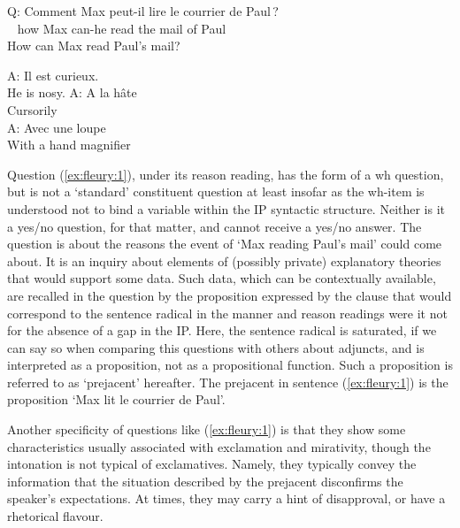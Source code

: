 \documentclass[output=paper,colorlinks,citecolor=brown,
]{langscibook}
\begin{document}
\begin{exe}
\ex\label{ex:fleury:1} 
\gll Q:  Comment Max peut-il lire le courrier de Paul\,?  \\   
{~} how Max can-he read the mail of Paul \\ 
\glt {~~~~} How can Max read Paul's mail? 
\begin{xlist}
\ex \label{ex:fleury:1a} 
A: Il est curieux.\\
He is nosy.
\ex \label{ex:fleury:1b}
A: A la h\^ate\\
\glt Cursorily\\
\ex \label{ex:fleury:1c}
A: Avec une loupe\\
With a hand magnifier\\
\end{xlist}
\end{exe}

Question (\ref{ex:fleury:1}), under its reason reading,   has the form of a wh question, but
is not a `standard' constituent question at least insofar as the wh-item is understood not to bind a variable within the {IP} syntactic structure. Neither is it  a yes/no question, for that matter, and cannot receive a yes/no answer. 
The question is about the reasons the event of `Max reading Paul's mail' could come about. 
It is an inquiry about elements of (possibly private)  explanatory theories that would support  some data. 
Such data, which can be contextually available,
are
recalled in the question by 
  the proposition expressed by the clause that would correspond to the sentence radical in the manner and reason readings were it not for the absence of a gap in the IP. Here, the sentence radical is saturated, if we can say so when comparing this questions with others about adjuncts, {and is interpreted as a proposition, not as a propositional function}. Such a proposition is referred to as `prejacent' hereafter. 
 The  {prejacent} in sentence  (\ref{ex:fleury:1}) is the proposition `Max lit le courrier de Paul'.
 

Another specificity of questions like (\ref{ex:fleury:1}) is that they show some characteristics usually associated with exclamation and mirativity, though the intonation is not typical of exclamatives.
Namely, they typically convey the information that the 
situation described by the prejacent disconfirms the speaker's expectations.
At times, they may carry a hint of disapproval, or
have a rhetorical flavour. 
\end{document}
